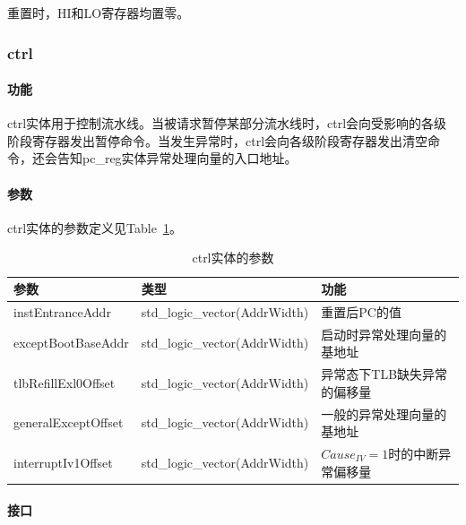 \documentclass{article}
\begin{document}
\begin{spacing}{1.4}
重置时，HI和LO寄存器均置零。

\subsubsection{ctrl}

\paragraph{功能}\mbox{}

ctrl实体用于控制流水线。当被请求暂停某部分流水线时，ctrl会向受影响的各级阶段寄存器发出暂停命令。当发生异常时，ctrl会向各级阶段寄存器发出清空命令，还会告知pc\_reg实体异常处理向量的入口地址。

\paragraph{参数}\mbox{}

ctrl实体的参数定义见Table~\ref{tb:ctrl-parameter}。
\begin{table}[!htb]
\begin{center}
\begin{tabular*}{15cm}{l|l|l}
\hline
\textbf{参数}&\textbf{类型}&\textbf{功能} \\
\hline instEntranceAddr        & std\_logic\_vector(AddrWidth)    & 重置后PC的值 \\
\hline exceptBootBaseAddr      & std\_logic\_vector(AddrWidth)    & 启动时异常处理向量的基地址 \\
\hline tlbRefillExl0Offset     & std\_logic\_vector(AddrWidth)    & 异常态下TLB缺失异常的偏移量 \\
\hline generalExceptOffset     & std\_logic\_vector(AddrWidth)    & 一般的异常处理向量的基地址 \\
\hline interruptIv1Offset      & std\_logic\_vector(AddrWidth)    & $Cause_{IV}=1$时的中断异常偏移量 \\
\hline
\end{tabular*}
\caption{ctrl实体的参数}
\label{tb:ctrl-parameter}
\end{center}
\end{table}

\paragraph{接口}\mbox{}


\end{spacing}
\end{document}
